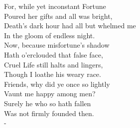 \documentclass[12pt]{book}
\newenvironment{ipoem}[1]%
  {\setcounter{poemindentevery}{#1}\begin{poem}\small}%
  {\end{poem}\setcounter{poemindentevery}{0}}
\begin{document}
\begin{ipoem}{2}
    For, while yet inconstant Fortune \\
      Poured her gifts and all was bright, \\
    Death's dark hour had all but whelmed me \\
      In the gloom of endless night. \\
    Now, because misfortune's shadow \\
      Hath o'erclouded that false face, \\
    Cruel Life still halts and lingers, \\
      Though I loathe his weary race. \\
    Friends, why did ye once so lightly \\
      Vaunt me happy among men? \\
    Surely he who so hath fallen \\
      Was not firmly founded then. \\-
\end{ipoem}
\end{document}
